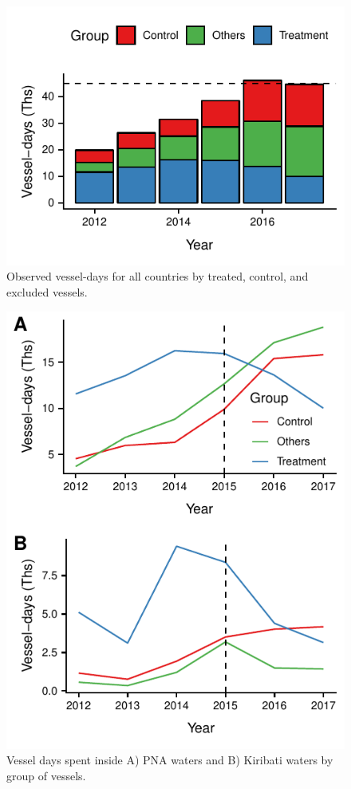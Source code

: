\documentclass[9p,twocolumn,twoside,lineno]{pnas-new}
\begin{document}
\begin{figure}
\centering
	\includegraphics{img/all_PS_VDS_year.pdf}
	\caption{\label{fig:all_PS_VDS_year}Observed vessel-days for all countries by treated, control, and excluded vessels.}
\end{figure}

\begin{figure}[H]
\centering
	\includegraphics{img/included_PS_VDS_year_DiD.pdf}
	\caption{\label{fig:included_PS_VDS_year_DiD}Vessel days spent inside A) PNA waters and B) Kiribati waters by group of vessels.}
\end{figure}
\end{document}
